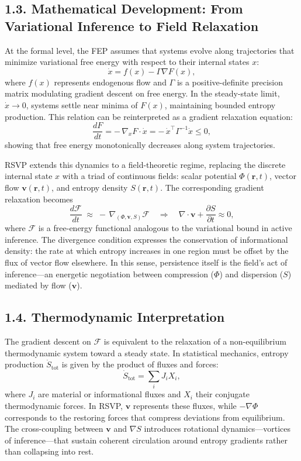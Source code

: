 \documentclass[12pt,a4paper]{article}
\begin{document}
\subsection{1.3. Mathematical Development: From Variational Inference to Field Relaxation}

At the formal level, the FEP assumes that systems evolve along trajectories that minimize variational free energy with respect to their internal states \(x\):
\[
\dot{x} = f(x) - \Gamma \nabla F(x),
\]
where \(f(x)\) represents endogenous flow and \(\Gamma\) is a positive-definite precision matrix modulating gradient descent on free energy.  
In the steady-state limit, \(\dot{x} \to 0\), systems settle near minima of \(F(x)\), maintaining bounded entropy production.  
This relation can be reinterpreted as a gradient relaxation equation:
\[
\frac{dF}{dt} = -\,\nabla_x F \cdot \dot{x} = -\,\dot{x}^{\!\top}\Gamma^{-1}\dot{x} \le 0,
\]
showing that free energy monotonically decreases along system trajectories.

RSVP extends this dynamics to a field-theoretic regime, replacing the discrete internal state \(x\) with a triad of continuous fields: scalar potential \(\Phi(\mathbf{r},t)\), vector flow \(\mathbf{v}(\mathbf{r},t)\), and entropy density \(S(\mathbf{r},t)\).  
The corresponding gradient relaxation becomes
\[
\frac{d\mathcal{F}}{dt}
\;\approx\;
-\,\nabla_{(\Phi,\mathbf{v},S)}\mathcal{F}
\quad\Rightarrow\quad
\nabla\!\cdot\!\mathbf{v} + \frac{\partial S}{\partial t} \approx 0,
\]
where \(\mathcal{F}\) is a free-energy functional analogous to the variational bound in active inference.  
The divergence condition expresses the conservation of informational density: the rate at which entropy increases in one region must be offset by the flux of vector flow elsewhere.  
In this sense, persistence itself is the field’s act of inference—an energetic negotiation between compression (\(\Phi\)) and dispersion (\(S\)) mediated by flow (\(\mathbf{v}\)).

\subsection{1.4. Thermodynamic Interpretation}

The gradient descent on \(\mathcal{F}\) is equivalent to the relaxation of a non-equilibrium thermodynamic system toward a steady state.  
In statistical mechanics, entropy production \(\dot{S}_{\text{tot}}\) is given by the product of fluxes and forces:
\[
\dot{S}_{\text{tot}} = \sum_i J_i X_i,
\]
where \(J_i\) are material or informational fluxes and \(X_i\) their conjugate thermodynamic forces.  
In RSVP, \(\mathbf{v}\) represents these fluxes, while \(-\nabla\Phi\) corresponds to the restoring forces that compress deviations from equilibrium.  
The cross-coupling between \(\mathbf{v}\) and \(\nabla S\) introduces rotational dynamics—vortices of inference—that sustain coherent circulation around entropy gradients rather than collapsing into rest.
\end{document}
